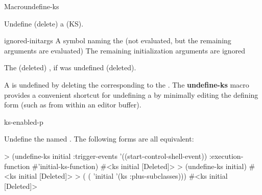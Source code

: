 \documentclass[10pt,twoside,english,pdftex]{article}
\begin{document}

\begin{functiondoc}{Macro}{undefine-ks}{
      
    \returns{} }
%
%
%

\fnsyntax

\fnpurpose Undefine (delete) a  (KS).

\fnpackage {}

\fnmodule {}

\fnargs
\begin{args}{ignored-initargs}
\arg[ks-name] A symbol naming the  (not evaluated, but the remaining
arguments are evaluated)
 The remaining initialization arguments are ignored
\end{args}

\fnreturns The (deleted)  , if
  was undefined (deleted).

\fndescription A  is undefined by deleting the 
corresponding to the .  The \textbf{undefine-ks} macro provides a
convenient shortcut for undefining a  by minimally editing the
defining form (such as from within an editor buffer).

\begin{alsos}{ks-enabled-p}
\also[define-ks]
\also[ks-enabled-p]
\end{alsos}

\fnexamples
Undefine the  named . The following forms are all
equivalent:
%
\W\supp
\begin{example}
> (undefine-ks initial
     :trigger-events '((start-control-shell-event)) 
     :execution-function #'initial-ks-function)
#<ks initial [Deleted]>\goodpagebreak
> (undefine-ks initial)
#<ks initial [Deleted]>\goodpagebreak
> ( 
     ( 'initial '(ks :plus-subclasses)))
#<ks initial [Deleted]>
\end{example}

\end{functiondoc}

\end{document}

